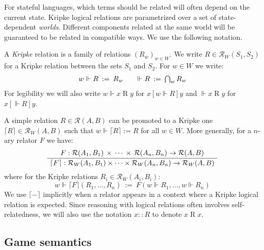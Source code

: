 \documentclass[sigplan,10pt,review,anonymous]{acmart}
\newcommand{\ifr}[1]{\mathrel{[{#1}]}}
\begin{document}

For stateful languages,
which terms should be related
will often depend on the current state.
Kripke logical relations
are parametrized over a set of state-dependent \emph{worlds}.
Different components related at the same world
will be guaranteed to be related in compatible ways.
We use the following notation.

\begin{definition} \label{def:klr} %
A \emph{Kripke} relation is
a family of relations $(R_w)_{w \in W}$.
We write $R \in \mathcal{R}_W(S_1, S_2)$
for a Kripke relation between the sets $S_1$ and $S_2$.
For $w \in W$ we write:
\[
\begin{array}{c@{\qquad}c}
    w \Vdash R \: := \: R_w &
    \Vdash R \: := \: \bigcap_{w} R_w
\end{array}
\]
For legibility we will also write
$w \Vdash x \mathrel{R} y$ for $x \ifr{w \Vdash R} y$
and $\Vdash x \mathrel{R} y$ for $x \ifr{\Vdash R} y$.
\end{definition}

A simple relation $R \in \mathcal{R}(A, B)$
can be promoted to a Kripke one
$\lceil R \rceil \in \mathcal{R}_W(A, B)$
such that $w \Vdash \lceil R \rceil := R$ for all $w \in W$.
More generally, for a $n$-ary relator $F$ we have:
\[
  \AxiomC{$
    F :
      \mathcal{R}(A_1, B_1) \,\times\,\cdots\,\times\,\mathcal{R}(A_n, B_n)
      \rightarrow \mathcal{R}(A, B)$}
  \UnaryInfC{$
    \lceil F \rceil :
      \mathcal{R}_W(A_1, B_1) \times \cdots \times \mathcal{R}_W(A_n, B_n)
      \rightarrow \mathcal{R}_W(A, B)$}
  \DisplayProof
\]
where for the Kripke relations $R_i \in \mathcal{R}_W(A_i, B_i)$:
\[
  w \Vdash \lceil F \rceil (R_1, \ldots, R_n) \: := \:
    F(w \Vdash R_1, \ldots, w \Vdash R_n)
\]
We use $\lceil - \rceil$ implicitly
when a relator appears in a context where
a Kripke logical relation is expected.
Since reasoning with logical relations
often involves self-relatedness,
we will also use the notation
$x :: R$ to denote $x \mathrel{R} x$.


\subsection{Game semantics} \label{sec:gamesem} %
\end{document}
